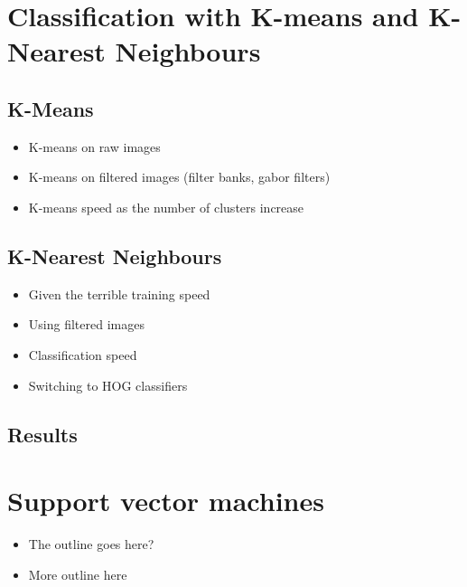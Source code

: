 \documentclass{article} %
\begin{document}
\section{Classification with K-means and K-Nearest Neighbours}
    \subsection{K-Means} %
    \label{ssub:K-Means}
        \begin{itemize}
            \item K-means on raw images
            \item K-means on filtered images (filter banks, gabor filters)
            \item K-means speed as the number of clusters increase
        \end{itemize}

    \subsection{K-Nearest Neighbours} %
    \label{sub:K-Nearest Neighbours}
        \begin{itemize}
            \item Given the terrible training speed
            \item Using filtered images
            \item Classification speed
            \item Switching to HOG classifiers
        \end{itemize}

    \subsection{Results} %
    \label{sub:Results}
    

\section{Support vector machines}
    \begin{itemize}
        \item The outline goes here?
        \item More outline here
    \end{itemize}
\end{document}
